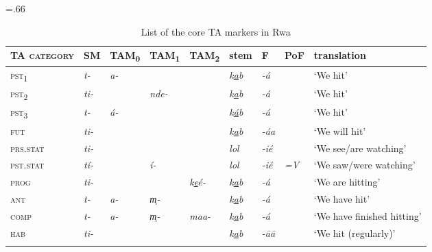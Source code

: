 \documentclass[output=paper]{langscibook}
\begin{document}
\begin{table}
\small\tabcolsep=.66\tabcolsep
\begin{tabularx}{\textwidth}{>{\scshape}llllllllQ}
\lsptoprule
{\normalfont TA category} & SM & {TAM\textsubscript{0}} & {TAM\textsubscript{1}} & {TAM\textsubscript{2}} & stem & F & PoF & translation\\
\midrule
pst\textsubscript{1} & {\itshape t-} & {\itshape a-} &  &  & {\textit{k\ul{a}b}} & {\itshape {}-á} &  & `We hit'\\
pst\textsubscript{2} & {\itshape ti-} &  & {\itshape nde-} &  & {\textit{k\ul{a}b}} & {\itshape {}-á} &  & `We hit'\\
pst\textsubscript{3} & {\itshape t-} & {\itshape á-} &  &  & {\textit{k\ul{á}b}} & {\itshape {}-á} &  & `We hit'\\
fut                  & {\itshape ti-} &  &  &  & {\textit{k\ul{a}b}} & {\itshape {}-áa} &  & `We will hit'\\
prs.stat             & {\itshape ti-} &  &  &  & { \textit{lol}} & {\itshape {}-ié} &  & {`We see/are watching'}\\
pst.stat             & {\itshape tí-} &  & {\itshape í-} &  & {\textit{lol}} & {\itshape {}-ié} & {\itshape =V} & `We saw/were watching'\\
prog                 & {\itshape ti-} &  &  & {\textit{k\ul{e}é-}} & {\textit{k\ul{a}b}} & {\itshape {}-á} &  & {`We are hitting'}\\
ant                  & {\itshape t-} & {\itshape a-} & {\itshape m̩-} &  & {\textit{k\ul{a}b}} & {\itshape {}-á} &  & `We have hit'\\
comp                 & {\itshape t-} & {\itshape a-} & {\itshape m̩-} & {\itshape maa-} & {\textit{k\ul{a}b}} & {\itshape {}-á} &  & {`We have finished hitting'}\\
hab                  & {\itshape ti-} &  &  &  & {\textit{k\ul{a}b}} & {\itshape {}-āā} &  & {`We hit (regularly)'}\\
\lspbottomrule
\end{tabularx}
\caption{List of the core TA markers in Rwa}
\label{tab:shinagawa:1}
\end{table}
\end{document}
